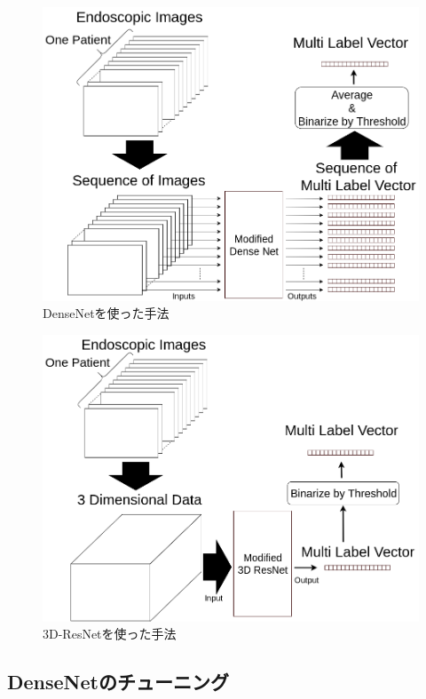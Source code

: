\begin{figure}[htbp]
    \begin{center}
        \includegraphics[width=122mm]{./fig/ieice2.png}
        \caption{DenseNetを使った手法}
        \label{fig:densenet}
    \end{center}
\end{figure}

\begin{figure}[htbp]
    \begin{center}
        \includegraphics[width=122mm]{./fig/ieice3.png}
        \caption{3D-ResNetを使った手法}
        \label{fig:3d_resnet}
    \end{center}
\end{figure}

\newpage
\subsection{DenseNetのチューニング}

